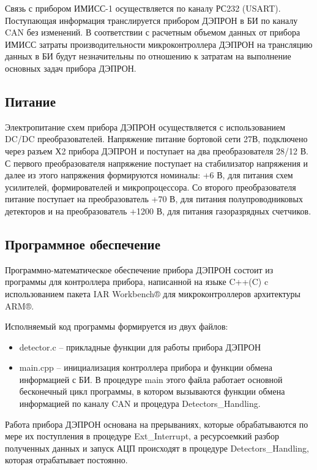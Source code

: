 \documentclass[a4paper,portrait,12pt]{article}
\begin{document}
{{{{Связь с прибором ИМИСС-1 осуществляется по каналу РС232 (USART). Поступающая информация транслируется прибором ДЭПРОН в БИ по каналу CAN без изменений. В соответствии с расчетным объемом данных от прибора ИМИСС затраты производительности микроконтроллера ДЭПРОН на трансляцию данных в БИ будут незначительны по отношению к затратам на выполнение основных задач прибора ДЭПРОН.





\subsection*{	\textbf{Питание}}

Электропитание схем прибора ДЭПРОН осуществляется с использованием DC/DC преобразователей. Напряжение питание бортовой сети 27В, подключено через разъем Х2 прибора ДЭПРОН и поступает на два преобразователя 28/12 В. С первого преобразователя напряжение поступает на стабилизатор напряжения и далее из этого напряжения формируются номиналы: +6 В, для питания схем усилителей, формирователей и микропроцессора. Со второго преобразователя питание поступает на преобразователь +70 В, для питания полупроводниковых детекторов и на преобразователь +1200 В, для питания газоразрядных счетчиков.





\subsection*{	\textbf{ }\textbf{Программное обеспечение}}

Программно-математическое обеспечение прибора ДЭПРОН состоит из программы для контроллера прибора, написанной на языке C++(C) c использованием пакета IAR  Workbench® для микроконтроллеров архитектуры ARM®. 


Исполняемый код программы формируется из двух файлов: 


\begin{itemize}
\item 	detector.c -- прикладные функции для работы прибора ДЭПРОН


\item 	main.cpp -- инициализация контроллера прибора и функции обмена информацией с БИ. В процедуре main этого файла работает основной бесконечный цикл программы, в котором вызываются функции обмена информацией по каналу CAN и процедура Detectors\_Handling.


\end{itemize}
Работа прибора ДЭПРОН основана на прерываниях, которые обрабатываются по мере их поступления в процедуре Ext\_Interrupt, а ресурсоемкий разбор полученных данных и запуск АЦП происходят в процедуре Detectors\_Handling, которая отрабатывает постоянно. 





}}}}
\end{document}
